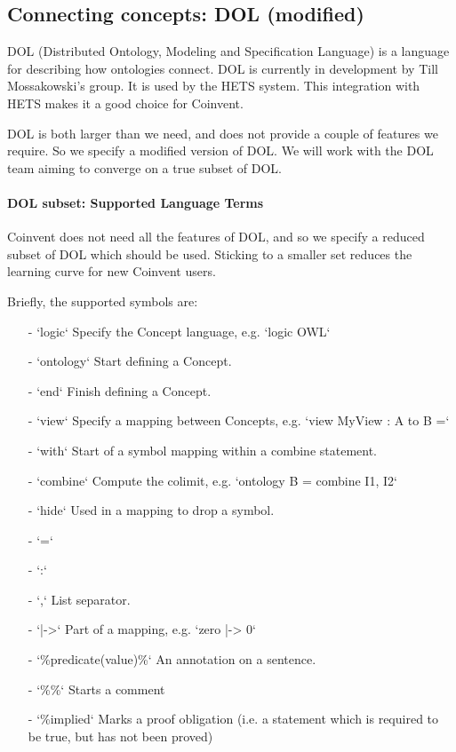 \documentclass[10pt]{article}
\begin{document}
\subsection{Connecting concepts: DOL (modified)}
DOL (Distributed Ontology, Modeling and Specification Language) is a language for describing how ontologies connect. 
DOL is currently in development by Till Mossakowski's group. It is used by the HETS system. This integration with HETS makes it a good choice for Coinvent.

DOL is both larger than we need, and does not provide a couple of features we require. So we specify a modified version of DOL. We will work with the DOL team aiming to
converge on a true subset of DOL.

\paragraph{DOL subset: Supported Language Terms}

Coinvent does not need all the features of DOL, and so we specify a reduced subset of DOL which should be used. Sticking to a smaller set reduces the learning curve for new Coinvent users.

Briefly, the supported symbols are:
\begin{itemize}
\item[-] `logic` Specify the Concept language, e.g. `logic OWL`
\item[-] `ontology` Start defining a Concept.
\item[-]`end` Finish defining a Concept. 
\item[-]`view` Specify a mapping between Concepts, e.g. `view MyView : A to B =`
\item[-]`with` Start of a symbol mapping within a combine statement.
\item[-]`combine` Compute the colimit, e.g. `ontology B = combine I1, I2`
\item[-]`hide` Used in a mapping to drop a symbol.
\item[-]`=`
\item[-]`:`
\item[-]`,` List separator.
\item[-]`|->` Part of a mapping, e.g. `zero |-> 0`
\item[-] `\%predicate(value)\%` An annotation on a sentence. 
\item[-] `\%\%` Starts a comment
\item[-] `\%implied` Marks a proof obligation (i.e. a statement which is required to be true, but has not been proved)
\end{itemize}
\end{document}
